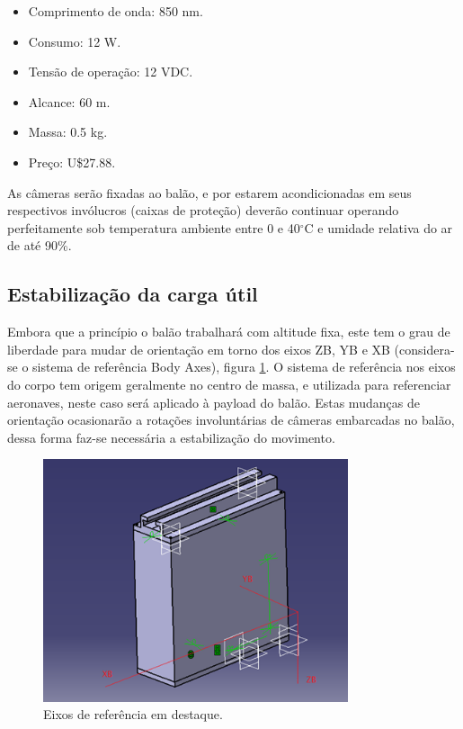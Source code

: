\begin{itemize}
	\item Comprimento de onda: 850 nm.
	\item Consumo: 12 W.
	\item Tensão de operação: 12 VDC.
	\item Alcance: 60 m.
	\item Massa: 0.5 kg.
	\item Preço: U\$27.88.
\end{itemize}

As câmeras serão fixadas ao balão, e por estarem acondicionadas em seus respectivos invólucros (caixas de proteção) deverão continuar operando perfeitamente sob temperatura ambiente
entre 0 e 40$^{\circ}$C e umidade relativa do ar de até 90\%.

\subsection{Estabilização da carga útil}

Embora que a princípio o balão trabalhará com altitude fixa, este tem o grau de liberdade para mudar de orientação em torno dos eixos ZB, YB e XB (considera-se o sistema de referência Body Axes), figura \ref{img:eixosreferencia}. O sistema de referência nos eixos do corpo tem origem geralmente no centro de massa, e utilizada para referenciar aeronaves, neste caso será aplicado à payload do balão. Estas mudanças de orientação ocasionarão a rotações involuntárias de câmeras embarcadas no balão, dessa forma faz-se necessária a estabilização do movimento.

\begin{figure}[H]
  \centering
  \includegraphics[width=0.8\textwidth]{figuras/estrutura}
  \caption{Eixos de referência em destaque.}
  \label{img:eixosreferencia}
\end{figure}

